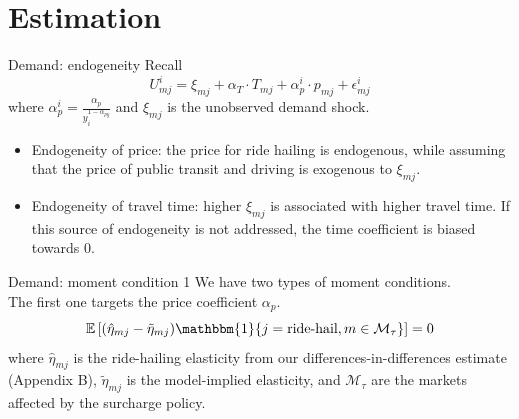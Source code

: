 \documentclass[10pt, aspectratio=169]{beamer}
\begin{document}
\section{Estimation}
\begin{frame}{Demand: endogeneity}
  Recall
  $$ U_{mj}^i = \xi_{mj} + \alpha_T \cdot T_{mj} + \alpha_p^i \cdot p_{mj} + \epsilon_{mj}^i $$
  where $\alpha_p^i = \frac{\alpha_p}{y_i^{1 - \alpha_{py}}}$ and $\xi_{mj} $ is the unobserved demand shock.
  \begin{itemize}
    \item Endogeneity of price: the price for ride hailing is endogenous, while assuming
          that the price of public transit and driving is exogenous to $\xi_{mj}$.
    \item Endogeneity of travel time: higher $\xi_{mj}$ is associated with higher travel
          time. If this source of endogeneity is not addressed, the time coefficient is
          biased towards 0.
  \end{itemize}
\end{frame}

\begin{frame}{Demand: moment condition 1}
  We have two types of moment conditions.\\
  The first one targets the price coefficient $\alpha_p$.
  \begin{equation*}
    \mathbb{E} \left[ (\hat{\eta}_{mj} - \tilde{\eta}_{mj}) \mathbbm{1}\{ j = \text{ride-hail}, m \in \mathcal{M}_{\tau} \} \right] = 0
  \end{equation*} where \(\hat{\eta}_{mj}\) is the ride-hailing elasticity from our differences-in-differences estimate (Appendix B), \(\tilde{\eta}_{mj}\) is the model-implied elasticity, and \(\mathcal{M}_{\tau}\) are the markets affected by the surcharge policy.

\end{frame}
\end{document}

